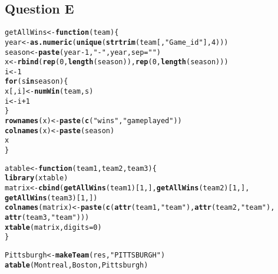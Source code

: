 \documentclass[12pt,letterpaper]{article}\usepackage[]{graphicx}\usepackage[]{color}
\makeatletter
\newcommand{\hlnum}[1]{\textcolor[rgb]{0.686,0.059,0.569}{#1}}%
\newcommand{\hlstr}[1]{\textcolor[rgb]{0.192,0.494,0.8}{#1}}%
\newcommand{\hlopt}[1]{\textcolor[rgb]{0,0,0}{#1}}%
\newcommand{\hlstd}[1]{\textcolor[rgb]{0.345,0.345,0.345}{#1}}%
\newcommand{\hlkwa}[1]{\textcolor[rgb]{0.161,0.373,0.58}{\textbf{#1}}}%
\newcommand{\hlkwb}[1]{\textcolor[rgb]{0.69,0.353,0.396}{#1}}%
\newcommand{\hlkwc}[1]{\textcolor[rgb]{0.333,0.667,0.333}{#1}}%
\newcommand{\hlkwd}[1]{\textcolor[rgb]{0.737,0.353,0.396}{\textbf{#1}}}%
\newenvironment{kframe}{%
 \def\at@end@of@kframe{}%
 \ifinner\ifhmode%
  \def\at@end@of@kframe{\end{minipage}}%
  \begin{minipage}{\columnwidth}%
 \fi\fi%
 \def\FrameCommand##1{\hskip\@totalleftmargin \hskip-\fboxsep
 \colorbox{shadecolor}{##1}\hskip-\fboxsep
     \hskip-\linewidth \hskip-\@totalleftmargin \hskip\columnwidth}%
 \MakeFramed {\advance\hsize-\width
   \@totalleftmargin\z@ \linewidth\hsize
   \@setminipage}}%
 {\par\unskip\endMakeFramed%
 \at@end@of@kframe}
\newenvironment{knitrout}{}{} %
\makeatother
\begin{document}
\subsection{Question E}
\begin{knitrout}
\color{fgcolor}\begin{kframe}
\begin{alltt}
\hlstd{getAllWins} \hlkwb{<-} \hlkwa{function}\hlstd{(}\hlkwc{team}\hlstd{)\{}
  \hlstd{year} \hlkwb{<-} \hlkwd{as.numeric}\hlstd{(}\hlkwd{unique}\hlstd{(}\hlkwd{strtrim}\hlstd{(team[,}\hlstr{"Game_id"}\hlstd{],}\hlnum{4}\hlstd{)))}
  \hlstd{season} \hlkwb{<-} \hlkwd{paste}\hlstd{(year}\hlopt{-}\hlnum{1}\hlstd{,} \hlstr{"-"}\hlstd{, year,} \hlkwc{sep} \hlstd{=} \hlstr{""}\hlstd{)}
  \hlstd{x} \hlkwb{<-} \hlkwd{rbind}\hlstd{(}\hlkwd{rep}\hlstd{(}\hlnum{0}\hlstd{,} \hlkwd{length}\hlstd{(season)),} \hlkwd{rep}\hlstd{(}\hlnum{0}\hlstd{,} \hlkwd{length}\hlstd{(season)))}
  \hlstd{i} \hlkwb{<-} \hlnum{1}
  \hlkwa{for} \hlstd{(s} \hlkwa{in} \hlstd{season) \{}
    \hlstd{x[,i]} \hlkwb{<-} \hlkwd{numWin}\hlstd{(team,s)}
    \hlstd{i} \hlkwb{<-} \hlstd{i}\hlopt{+}\hlnum{1}
  \hlstd{\}}
  \hlkwd{rownames}\hlstd{(x)} \hlkwb{<-} \hlkwd{paste}\hlstd{(}\hlkwd{c}\hlstd{(}\hlstr{"wins"}\hlstd{,}\hlstr{"gameplayed"}\hlstd{))}
  \hlkwd{colnames}\hlstd{(x)} \hlkwb{<-} \hlkwd{paste}\hlstd{(season)}
  \hlstd{x}
\hlstd{\}}

\hlstd{atable} \hlkwb{<-} \hlkwa{function}\hlstd{(}\hlkwc{team1}\hlstd{,} \hlkwc{team2}\hlstd{,} \hlkwc{team3}\hlstd{)\{}
  \hlkwd{library}\hlstd{(xtable)}
  \hlstd{matrix} \hlkwb{<-} \hlkwd{cbind}\hlstd{(}\hlkwd{getAllWins}\hlstd{(team1)[}\hlnum{1}\hlstd{,],} \hlkwd{getAllWins}\hlstd{(team2)[}\hlnum{1}\hlstd{,],}
                  \hlkwd{getAllWins}\hlstd{(team3)[}\hlnum{1}\hlstd{,])}
  \hlkwd{colnames}\hlstd{(matrix)} \hlkwb{<-} \hlkwd{paste}\hlstd{(}\hlkwd{c}\hlstd{(}\hlkwd{attr}\hlstd{(team1,}\hlstr{"team"}\hlstd{),} \hlkwd{attr}\hlstd{(team2,} \hlstr{"team"}\hlstd{),}
                              \hlkwd{attr}\hlstd{(team3,}\hlstr{"team"}\hlstd{)))}
  \hlkwd{xtable}\hlstd{(matrix,} \hlkwc{digits}\hlstd{=}\hlnum{0}\hlstd{)}
\hlstd{\}}
\end{alltt}
\end{kframe}
\end{knitrout}
\begin{knitrout}
\color{fgcolor}\begin{kframe}
\begin{alltt}
\hlstd{Pittsburgh} \hlkwb{<-} \hlkwd{makeTeam}\hlstd{(res,} \hlstr{"PITTSBURGH"}\hlstd{)}
\hlkwd{atable}\hlstd{(Montreal, Boston, Pittsburgh)}
\end{alltt}
\end{kframe}
\end{knitrout}
\end{document}
